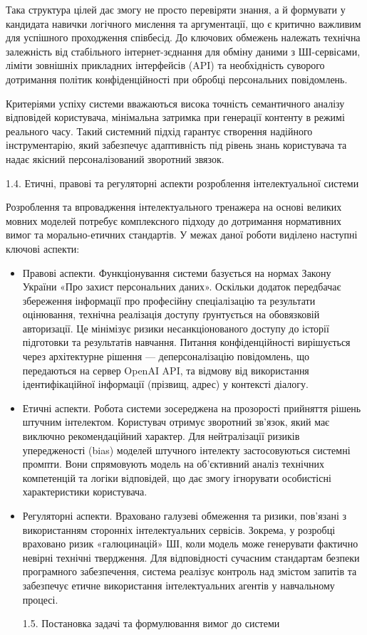 Така структура цілей дає змогу не просто перевіряти знання, а й
формувати у кандидата навички логічного мислення та аргументації, що є
критично важливим для успішного проходження співбесід. До ключових
обмежень належать технічна залежність від стабільного
інтернет-з\textquotesingle єднання для обміну даними з ШІ-сервісами,
ліміти зовнішніх прикладних інтерфейсів (API) та необхідність суворого
дотримання політик конфіденційності при обробці персональних
повідомлень.

Критеріями успіху системи вважаються висока точність семантичного
аналізу відповідей користувача, мінімальна затримка при генерації
контенту в режимі реального часу. Такий системний підхід гарантує
створення надійного інструментарію, який забезпечує адаптивність під
рівень знань користувача та надає якісний персоналізований зворотний
зв\textquotesingle язок.

\protect{}\label{_Toc228981055}{}1.4. Етичні, правові та
регуляторні аспекти розроблення інтелектуальної системи

Розроблення та впровадження інтелектуального тренажера на основі великих
мовних моделей потребує комплексного підходу до дотримання нормативних
вимог та морально-етичних стандартів. У межах даної роботи виділено
наступні ключові аспекти:

\begin{itemize}
\item
  Правові аспекти. Функціонування системи базується на нормах Закону
  України «Про захист персональних даних». Оскільки додаток передбачає
  збереження інформації про професійну спеціалізацію та результати
  оцінювання, технічна реалізація доступу ґрунтується на
  обов\textquotesingle язковій авторизації. Це мінімізує ризики
  несанкціонованого доступу до історії підготовки та результатів
  навчання. Питання конфіденційності вирішується через архітектурне
  рішення --- деперсоналізацію повідомлень, що передаються на сервер
  OpenAI API, та відмову від використання ідентифікаційної інформації
  (прізвищ, адрес) у контексті діалогу.
\item
  Етичні аспекти. Робота системи зосереджена на прозорості прийняття
  рішень штучним інтелектом. Користувач отримує зворотний зв'язок, який
  має виключно рекомендаційний характер. Для нейтралізації ризиків
  упередженості (bias) моделей штучного інтелекту застосовуються
  системні промпти. Вони спрямовують модель на об'єктивний аналіз
  технічних компетенцій та логіки відповідей, що дає змогу ігнорувати
  особистісні характеристики користувача.
\item
  Регуляторні аспекти. Враховано галузеві обмеження та ризики, пов'язані
  з використанням сторонніх інтелектуальних сервісів. Зокрема, у
  розробці враховано ризик «галюцинацій» ШІ, коли модель може генерувати
  фактично невірні технічні твердження. Для відповідності сучасним
  стандартам безпеки програмного забезпечення, система реалізує контроль
  над змістом запитів та забезпечує етичне використання інтелектуальних
  агентів у навчальному процесі.

  \protect{}\label{_Toc228981056}{}1.5. Постановка задачі
  та формулювання вимог до системи
\end{itemize}

